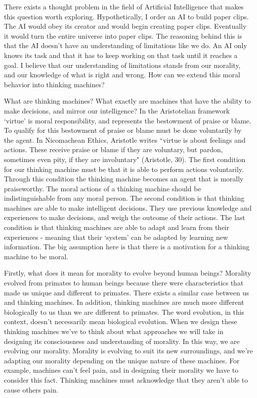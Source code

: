 \documentclass[11pt, oneside]{article}
\begin{document}
\par There exists a thought problem in the field of Artificial Intelligence that makes this question worth exploring. Hypothetically, I order an AI to build paper clips. The AI would obey its creator and would begin creating paper clips. Eventually it would turn the entire universe into paper clips. The reasoning behind this is that the AI doesn't have an understanding of limitations like we do. An AI only knows its task and that it has to keep working on that task until it reaches a goal. I believe that our understanding of limitations stands from our morality, and our knowledge of what is right and wrong. How can we extend this moral behavior into thinking machines?

\par 
What are thinking machines? What exactly are machines that have the ability to make decisions, and mirror our intelligence? 
In the Aristotelian framework `virtue' is moral responsibility, and represents the bestowment of praise or blame. To qualify for this bestowment of praise or blame must be done voluntarily by the agent. In Nicomachean Ethics, Aristotle writes ``virtue is about feelings and actions. These receive praise or blame if they are voluntary, but pardon, sometimes even pity, if they are involuntary" (Aristotle, 30). The first condition for our thinking machine must be that it is able to perform actions voluntarily. Through this condition the thinking machine becomes an agent that is morally praiseworthy. The moral actions of a thinking machine should be indistinguishable from any moral person. 
The second condition is that thinking machines are able to make intelligent decisions. They use previous knowledge and experiences to make decisions, and weigh the outcome of their actions. The last condition is that thinking machines are able to adapt and learn from their experiences - meaning that their `system' can be adapted by learning new information. The big assumption here is that there is a motivation for a thinking machine to be moral. 

\par 
Firstly, what does it mean for morality to evolve beyond human beings? Morality evolved from primates to human beings because there were characteristics that made us unique and different to primates. There exists a similar case between us and thinking machines. In addition, thinking machines are much more different biologically to us than we are different to primates. 
The word evolution, in this context, doesn't necessarily mean biological evolution. When we design these thinking machines we've to think about what approaches we will take in designing its consciousness and understanding of morality. In this way, we are evolving our morality. 
Morality is evolving to suit its new surroundings, and we're adapting our morality depending on the unique nature of these machines. For example, machines can't feel pain, and in designing their morality we have to consider this fact. Thinking machines must acknowledge that they aren't able to cause others pain.
\end{document}
